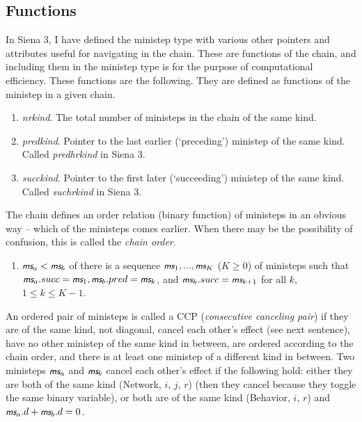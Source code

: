 \documentclass[a4paper,fleqn,12pt]{article}
\newcommand{\ms}{\textsl{\textsf{\small ms}}} %
\begin{document}
\subsection{Functions}

In Siena 3, I have defined the ministep type with various other pointers and attributes
useful for navigating in the chain.
These are functions of the chain, and including them in the ministep type
is for the purpose of computational efficiency.
These functions are the following. They are defined as functions of the ministep
in a given chain.

\begin{enumerate}
\item \textit{nrkind}. The total number of ministeps in the chain of the same kind.
\item \textit{predkind}. Pointer to the last earlier (`preceding') ministep of the same kind.\\
                         Called \textit{predhrkind} in Siena 3.
\item \textit{succkind}. Pointer to the first later (`succeeding') ministep of the same kind.\\
                         Called \textit{suchrkind} in Siena 3.
\end{enumerate}

The chain defines an order relation (binary function) of ministeps
in an obvious way -- which of the ministeps comes earlier.
When there may be the possibility of confusion,
this is called the \emph{chain order}.

\begin{enumerate}
\item $\ms_a < \ms_b$ of there is a sequence $\ms_1, ..., \ms_K$ ($K \geq 0$) of ministeps
      such that $\ms_a.succ = \ms_1, \ms_b.pred = \ms_k$, and $\ms_k.succ = \ms_{k+1}$
      for all $k$, $1 \leq k \leq K-1$.
\end{enumerate}

An ordered pair of ministeps is called a CCP (\emph{consecutive canceling pair})
if they are of the same kind, not diagonal, cancel each other's effect (see next sentence),
have no other ministep of the same kind in between, are ordered
according to the chain order, and there is at least one ministep of a
different kind in between.
Two ministeps $\ms_a$ and $\ms_b$ cancel each other's effect
if the following hold: either they are both of the same kind
(Network, $i,\, j,\, r$) (then they cancel because they toggle the same
binary variable), or both are of the same kind (Behavior, $i, \, r$)
and $\ms_a.d + \ms_b.d = 0$.
\end{document}
